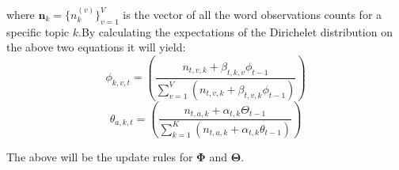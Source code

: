 where $\boldsymbol{n}_k = \{n_k^{(v)}\}_{v=1}^V$ is the vector of all the word observations counts for a specific topic $k$.By calculating the expectations of the Dirichelet distribution on the above two equations it will yield:
\begin{equation}\label{dophi}
\phi_{k,v,t} = \left(\frac{n_{t,v,k}+\beta_{t,k,v}\phi_{t-1}}{\sum_{v=1}^V \left(n_{t,v,k}+\beta_{t,v,k}\phi_{t-1} \right) } \right) 
\end{equation}
\begin{equation}\label{dotheta}
\theta_{a,k,t} = \left(\frac{n_{t,a,k}+\alpha_{t,k} \Theta_{t-1}}{\sum_{k=1}^K \left(n_{t,a,k}+\alpha_{t,k}\theta_{t-1} \right) } \right)
\end{equation}

The above will be the update rules for $\boldsymbol{\Phi}$ and $\boldsymbol{\Theta}$.

